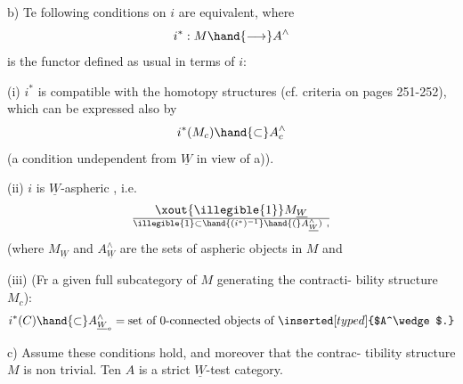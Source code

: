 b) Te following conditions on $i$ are equivalent, where
\[ i^* : M \hand{\longrightarrow} A^\wedge \]
is the functor defined as usual in terms of $i$:

(i) $i^*$ is compatible with the homotopy structures (cf. criteria on
pages 251-252), which can be expressed also by
\[ i^*(M_c) \hand{\subset} A^\wedge_c \]
(a condition undependent from $\underline{W}$\hand{,} in view of a)).

(ii) $i$ is $\underline{W}$-aspheric , i.e.
\[ \xout{\illegible{1}}M_{\underline{W}} \over{\illegible{1}}{\subset}\hand{(i^*)^{-1}}\hand{(}A^\wedge_{\underline{W}}) \ , \]
(where $M_{\underline{W}}$ and $A^\wedge_{\underline{W}}$ are the sets of  aspheric objects in $M$ and 

(iii) (Fr a given full subcategory  of $M$ generating the contracti-%
bility structure $M_c$):
\[ i^*(C) \hand{\subset} A^\wedge_{\underline{W}_o} = \text{set of 0-connected objects of } \inserted[typed]{$A^\wedge$.} \]

c) Assume these conditions hold, and moreover that the contrac-%
tibility structure  $M$ is non trivial. Ten $A$ is a strict $\underline{W}$-test
category.


